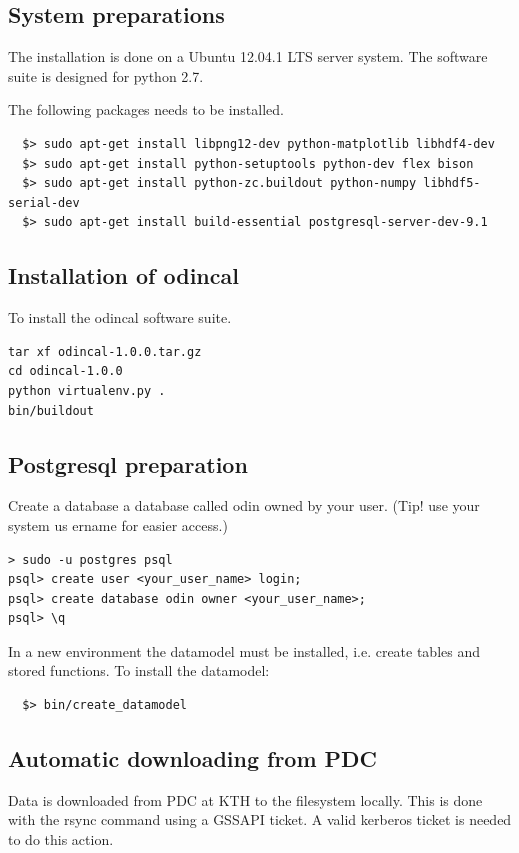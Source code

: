 \documentclass[12pt]{article}
\begin{document}
\subsection{System preparations}
The installation is done on a Ubuntu 12.04.1 LTS server system. The software suite is designed for python 2.7.

The following packages needs to be installed.
\begin{verbatim}  
  $> sudo apt-get install libpng12-dev python-matplotlib libhdf4-dev
  $> sudo apt-get install python-setuptools python-dev flex bison
  $> sudo apt-get install python-zc.buildout python-numpy libhdf5-serial-dev
  $> sudo apt-get install build-essential postgresql-server-dev-9.1
\end{verbatim}


\subsection{Installation of odincal}

To install the odincal software suite. 

\begin{verbatim}
tar xf odincal-1.0.0.tar.gz
cd odincal-1.0.0
python virtualenv.py .
bin/buildout
\end{verbatim}


\subsection{Postgresql preparation}
Create a database a database called odin owned by your user. (Tip! use your system us
ername for easier access.)
 
\begin{verbatim}  
> sudo -u postgres psql
psql> create user <your_user_name> login;
psql> create database odin owner <your_user_name>;
psql> \q
\end{verbatim}

In a new environment the datamodel must be installed, i.e. create tables and stored functions. To install the datamodel:

\begin{verbatim}  
  $> bin/create_datamodel
\end{verbatim}


\subsection{Automatic downloading from PDC}
Data is downloaded from PDC at KTH to the filesystem locally. This is done with the rsync command using a GSSAPI ticket. A valid kerberos ticket is needed to do this action.
\end{document}
